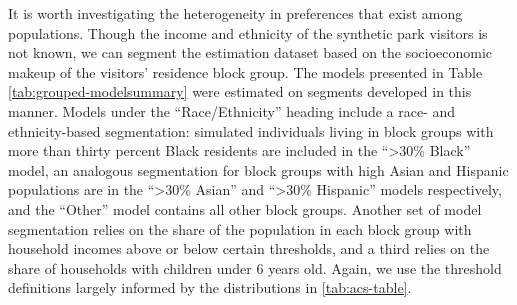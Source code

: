 \documentclass[3p, authoryear, review]{elsarticle} %
\begin{document}
It is worth investigating the heterogeneity in preferences that exist among populations. Though the income and ethnicity of the synthetic park visitors is not known, we can segment the estimation dataset based on the socioeconomic makeup of the visitors' residence block group. The models presented in Table \ref{tab:grouped-modelsummary} were estimated on segments developed in this manner. Models under the ``Race/Ethnicity'' heading include a race- and ethnicity-based segmentation: simulated individuals living in block groups with more than thirty percent Black residents are included in the ``\textgreater30\% Black'' model, an analogous segmentation for block groups with high Asian and Hispanic populations are in the ``\textgreater30\% Asian'' and ``\textgreater30\% Hispanic'' models respectively, and the ``Other'' model contains all other block groups. Another set of model segmentation relies on the share of the population in each block group with household incomes above or below certain thresholds, and a third relies on the share of households with children under 6 years old. Again, we use the threshold definitions largely informed by the distributions in \ref{tab:acs-table}.
\end{document}
